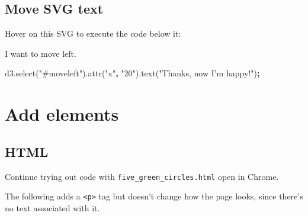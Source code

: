 \documentclass[openany]{book}
\newenvironment{Shaded}{\begin{snugshade}}{\end{snugshade}}
\newcommand{\AttributeTok}[1]{\textcolor[rgb]{0.77,0.63,0.00}{#1}}
\newcommand{\KeywordTok}[1]{\textcolor[rgb]{0.13,0.29,0.53}{\textbf{#1}}}
\newcommand{\NormalTok}[1]{#1}
\newcommand{\OperatorTok}[1]{\textcolor[rgb]{0.81,0.36,0.00}{\textbf{#1}}}
\newcommand{\OtherTok}[1]{\textcolor[rgb]{0.56,0.35,0.01}{#1}}
\newcommand{\StringTok}[1]{\textcolor[rgb]{0.31,0.60,0.02}{#1}}
\newcommand{\VariableTok}[1]{\textcolor[rgb]{0.00,0.00,0.00}{#1}}
\begin{document}
\hypertarget{move-svg-text}{%
\subsection{Move SVG text}\label{move-svg-text}}

\begin{Shaded}
\end{Shaded}

Hover on this SVG to execute the code below it:

I want to move left.

\hypertarget{move}{}
\begin{Shaded}
\begin{Highlighting}[]
\VariableTok{d3}\NormalTok{.}\AttributeTok{select}\NormalTok{(}\StringTok{"#moveleft"}\NormalTok{).}\AttributeTok{attr}\NormalTok{(}\StringTok{"x"}\OperatorTok{,} \StringTok{"20"}\NormalTok{).}\AttributeTok{text}\NormalTok{(}\StringTok{"Thanks, now I'm happy!"}\NormalTok{)}\OperatorTok{;}
\end{Highlighting}
\end{Shaded}

\hypertarget{add-elements}{%
\section{Add elements }\label{add-elements}}

\hypertarget{html-1}{%
\subsection{HTML}\label{html-1}}

Continue trying out code with \texttt{five\_green\_circles.html} open in Chrome.

The following adds a \texttt{\textless{}p\textgreater{}} tag but doesn't change how the page looks, since there's no text associated with it.
\end{document}
